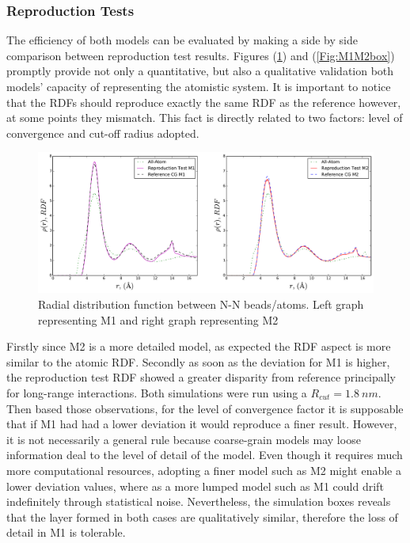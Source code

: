 \documentclass[10pt,a4paper,twoside]{article}
\begin{document}
\subsubsection{Reproduction Tests}
 The efficiency of both models can be evaluated by making a side by side comparison between reproduction test results. Figures (\ref{Fig:M1M2rdf}) and (\ref{Fig:M1M2box}) promptly provide not only a quantitative, but also a qualitative validation both models' capacity of representing the atomistic system. It is important to notice that the RDFs should reproduce exactly the same RDF as the reference however, at some points they mismatch. This fact is directly related to two factors: level of convergence and cut-off radius adopted.
     \begin{figure}[ht!]
  \begin{center}
	\includegraphics[width=1 \textwidth]{./graphs/rdfM1M2}
	\caption{Radial distribution function between N-N beads/atoms. Left graph representing M1 and right graph representing M2}
	\label{Fig:M1M2rdf}
  \end{center}
\end{figure} 

Firstly since M2 is a more detailed  model, as expected the RDF aspect is more similar to the atomic RDF. Secondly as soon as the deviation for M1 is higher, the reproduction test RDF showed a greater disparity from reference principally for long-range interactions. Both simulations were run using a $R_{cut} = 1.8 \ nm$.  Then based those observations, for the level of convergence factor it is supposable that if M1 had had a lower deviation it would reproduce a finer result. However, it is not necessarily a general rule because coarse-grain models may loose information deal to the level of detail of the model. Even though it requires much more computational resources, adopting a finer model such as M2 might enable a lower deviation values, where as a more lumped model such as M1 could drift indefinitely through statistical noise. Nevertheless, the simulation boxes reveals that the layer formed in both cases are qualitatively similar, therefore the loss of detail in M1 is tolerable.
\end{document}
